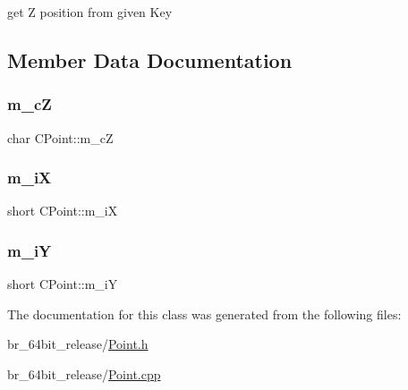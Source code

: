 get Z position from given Key 



\subsection{Member Data Documentation}
\mbox{\label{classCPoint_af5bd6bd96c41a2f050fe2f5f2d6595de}} 
\subsubsection{\texorpdfstring{m\_cZ}{m\_cZ}}
{\footnotesize\ttfamily char C\+Point\+::m\+\_\+cZ\hspace{0.3cm}{\ttfamily [protected]}}

\mbox{\label{classCPoint_ac9057a0b88c5ef9904b6b1e0f8f6ef33}} 
\subsubsection{\texorpdfstring{m\_iX}{m\_iX}}
{\footnotesize\ttfamily short C\+Point\+::m\+\_\+iX\hspace{0.3cm}{\ttfamily [protected]}}

\mbox{\label{classCPoint_a9b44115b3f3268f92c695e58bf8f910d}} 
\subsubsection{\texorpdfstring{m\_iY}{m\_iY}}
{\footnotesize\ttfamily short C\+Point\+::m\+\_\+iY\hspace{0.3cm}{\ttfamily [protected]}}



The documentation for this class was generated from the following files\+:\begin{DoxyCompactItemize}
\item 
br\+\_\+64bit\+\_\+release/\mbox{\hyperlink{Point_8h}{Point.\+h}}\item 
br\+\_\+64bit\+\_\+release/\mbox{\hyperlink{Point_8cpp}{Point.\+cpp}}\end{DoxyCompactItemize}
